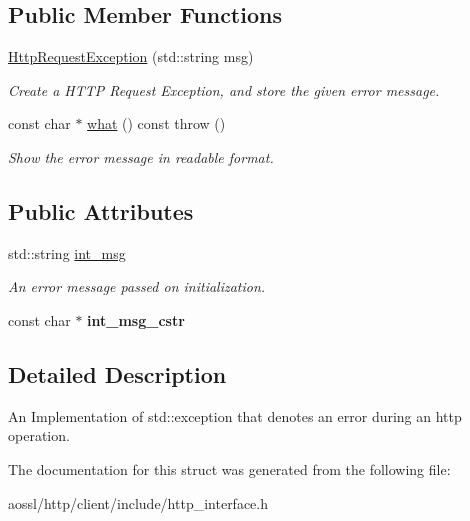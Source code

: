 \subsection*{Public Member Functions}
\begin{DoxyCompactItemize}
\item 
\hyperlink{structHttpRequestException_a8470fe285f8e7f0939b5068546967764}{Http\+Request\+Exception} (std\+::string msg)\hypertarget{structHttpRequestException_a8470fe285f8e7f0939b5068546967764}{}\label{structHttpRequestException_a8470fe285f8e7f0939b5068546967764}

\begin{DoxyCompactList}\small\item\em Create a H\+T\+TP Request Exception, and store the given error message. \end{DoxyCompactList}\item 
const char $\ast$ \hyperlink{structHttpRequestException_acf07a2f7382157a27c0c5d2cedb2f2e6}{what} () const   throw ()\hypertarget{structHttpRequestException_acf07a2f7382157a27c0c5d2cedb2f2e6}{}\label{structHttpRequestException_acf07a2f7382157a27c0c5d2cedb2f2e6}

\begin{DoxyCompactList}\small\item\em Show the error message in readable format. \end{DoxyCompactList}\end{DoxyCompactItemize}
\subsection*{Public Attributes}
\begin{DoxyCompactItemize}
\item 
std\+::string \hyperlink{structHttpRequestException_a52a64d4648b543b81050bec3fb039e5f}{int\+\_\+msg}\hypertarget{structHttpRequestException_a52a64d4648b543b81050bec3fb039e5f}{}\label{structHttpRequestException_a52a64d4648b543b81050bec3fb039e5f}

\begin{DoxyCompactList}\small\item\em An error message passed on initialization. \end{DoxyCompactList}\item 
const char $\ast$ {\bfseries int\+\_\+msg\+\_\+cstr}\hypertarget{structHttpRequestException_a6bc7d4b4588457f0ae35c0cdf8059942}{}\label{structHttpRequestException_a6bc7d4b4588457f0ae35c0cdf8059942}

\end{DoxyCompactItemize}


\subsection{Detailed Description}
An Implementation of std\+::exception that denotes an error during an http operation. 

The documentation for this struct was generated from the following file\+:\begin{DoxyCompactItemize}
\item 
aossl/http/client/include/http\+\_\+interface.\+h\end{DoxyCompactItemize}
